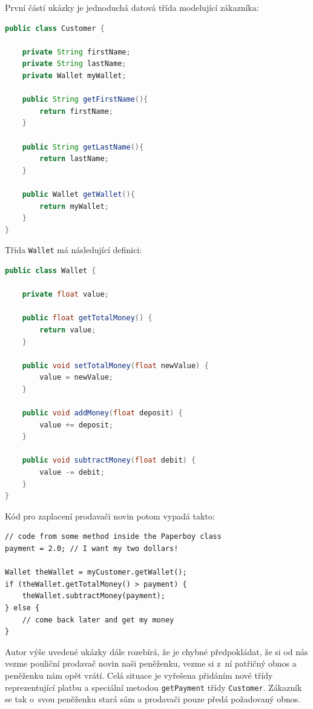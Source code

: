 První částí ukázky je jednoduchá datová třída modelující zákazníka:

\begin{lstlisting}[language=java]
public class Customer {

    private String firstName;
    private String lastName;
    private Wallet myWallet;

    public String getFirstName(){
        return firstName;
    }

    public String getLastName(){
        return lastName;
    }

    public Wallet getWallet(){
        return myWallet;
    }
}
\end{lstlisting}

Třída \verb+Wallet+ má následující definici:

\begin{lstlisting}[language=java]
public class Wallet {

    private float value;

    public float getTotalMoney() {
        return value;
    }

    public void setTotalMoney(float newValue) {
        value = newValue;
    }

    public void addMoney(float deposit) {
        value += deposit;
    }

    public void subtractMoney(float debit) {
        value -= debit;
    }
}
\end{lstlisting}

Kód pro zaplacení prodavači novin potom vypadá takto:
\begin{lstlisting}
// code from some method inside the Paperboy class
payment = 2.0; // I want my two dollars!

Wallet theWallet = myCustomer.getWallet();
if (theWallet.getTotalMoney() > payment) {
    theWallet.subtractMoney(payment);
} else {
    // come back later and get my money
}
\end{lstlisting}

Autor výše uvedené ukázky dále rozebírá, že je chybné předpokládat, že si od nás vezme pouliční prodavač novin naši peněženku, vezme si z~ní patřičný obnos a peněženku nám opět vrátí. Celá situace je vyřešena přidáním nové třídy reprezentující platbu a speciální metodou \verb+getPayment+ třídy \verb+Customer+. Zákazník se tak o~svou peněženku stará sám a prodavači pouze předá požadovaný obnos.

